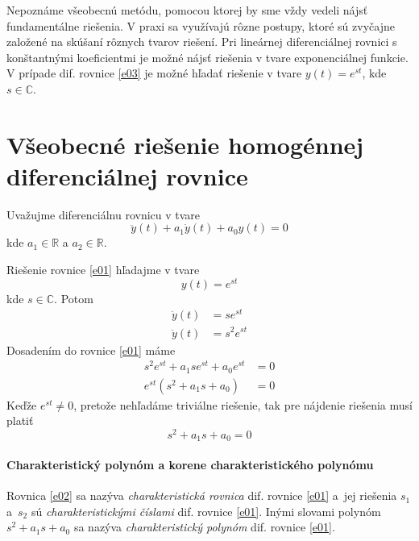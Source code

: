 \documentclass[a4paper, 10pt, ]{article}
\begin{document}
Nepoznáme všeobecnú metódu, pomocou ktorej by sme vždy vedeli nájsť fundamentálne riešenia. V praxi sa využívajú rôzne postupy, ktoré sú zvyčajne založené na skúšaní rôznych tvarov riešení. Pri lineárnej diferenciálnej rovnici s konštantnými koeficientmi je možné nájsť riešenia v tvare exponenciálnej funkcie. V prípade dif. rovnice \eqref{e03} je možné hľadať riešenie v tvare $y(t) = e^{s t}$, kde $s \in \mathbb C$.



\section{Všeobecné riešenie homogénnej diferenciálnej rovnice}

Uvažujme diferenciálnu rovnicu v tvare
\begin{equation}
    \ddot y(t) + a_1 \dot y(t) + a_0 y(t) = 0 \label{e01}
\end{equation}
kde $a_1 \in \mathbb R$ a $a_2  \in \mathbb R$.

Riešenie rovnice \eqref{e01} hľadajme v tvare 
\begin{equation}
    y(t) = e^{s t}
\end{equation}
kde $s \in \mathbb C$. Potom
\begin{align}
    \dot y(t) &= s e^{s t} \\
    \ddot y(t) &= s^2 e^{s t}
\end{align}
Dosadením do rovnice \eqref{e01} máme
\begin{subequations}
    \begin{align}
        s^2 e^{s t} + a_1 s e^{s t} + a_0 e^{s t} &= 0 \\
        e^{s t} (s^2 + a_1 s + a_0) &= 0
    \end{align}
\end{subequations}
Keďže $e^{s t} \neq 0$, pretože nehľadáme triviálne riešenie, tak pre nájdenie riešenia musí platiť
\begin{equation}
    s^2 + a_1 s + a_0 = 0 \label{e02}
\end{equation}


\paragraph{Charakteristický polynóm a korene charakteristického polynómu}

Rovnica \eqref{e02} sa nazýva \emph{charakteristická rovnica} dif. rovnice \eqref{e01} a~jej riešenia $s_1$ a~$s_2$ sú \emph{charakteristickými číslami} dif. rovnice \eqref{e01}. Inými slovami polynóm $s^2 + a_1 s + a_0$ sa nazýva \emph{charakteristický polynóm} dif. rovnice \eqref{e01}.
\end{document}
